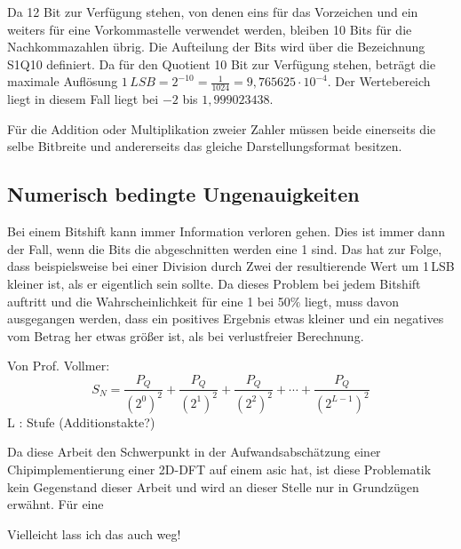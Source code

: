 Da 12 Bit zur Verfügung stehen, von denen eins für das Vorzeichen und ein weiters für eine Vorkommastelle verwendet werden, bleiben 10 Bits für die Nachkommazahlen übrig.
Die Aufteilung der Bits wird über die Bezeichnung S1Q10 definiert.
Da für den Quotient 10 Bit zur Verfügung stehen, beträgt die maximale Auflösung $1\,LSB = 2^{-10} = \frac{1}{1024} = 9,765625\cdot10^{-4}$.
Der Wertebereich liegt in diesem Fall liegt bei $-2$ bis $1,999023438$. 

Für die Addition oder Multiplikation zweier Zahler müssen beide einerseits die selbe Bitbreite und andererseits das gleiche Darstellungsformat besitzen.



 
\subsection{Numerisch bedingte Ungenauigkeiten}
Bei einem Bitshift kann immer Information verloren gehen. Dies ist immer dann der Fall, wenn die Bits die abgeschnitten werden eine 1 sind. Das hat zur Folge, dass beispielsweise
bei einer Division durch Zwei der resultierende Wert um 1\,LSB kleiner ist, als er eigentlich sein sollte. 
Da dieses Problem bei jedem Bitshift auftritt und die Wahrscheinlichkeit für eine 1 bei 50$\%$ liegt, muss davon ausgegangen werden, dass ein positives Ergebnis etwas kleiner und
ein negatives vom Betrag her etwas größer ist, als bei verlustfreier Berechnung. 


Von Prof. Vollmer: 
\begin{equation}
 S_N = \frac{P_Q}{\left(2^0\right)^2} + \frac{P_Q}{\left(2^1\right)^2} + \frac{P_Q}{\left(2^2\right)^2} + \cdots + \frac{P_Q}{\left(2^{L-1}\right)^2}
\end{equation}
L : Stufe (Additionstakte?)

Da diese Arbeit den Schwerpunkt in der Aufwandsabschätzung einer Chipimplementierung einer 2D-DFT auf einem \gls{asic} hat, ist diese Problematik kein Gegenstand dieser Arbeit und
wird an dieser Stelle nur in Grundzügen erwähnt. Für eine 

Vielleicht lass ich das auch weg!
